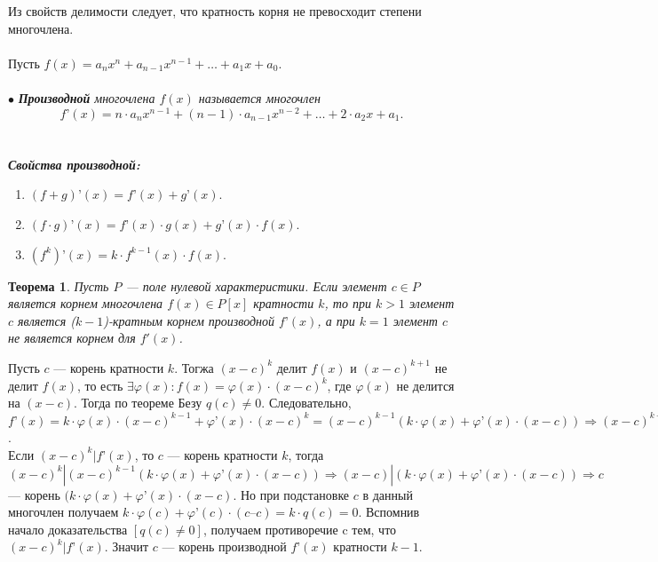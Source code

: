 Из свойств делимости следует, что кратность корня не превосходит степени многочлена.\\\\
Пусть $f(x) = a_nx^n + a_{n-1}x^{n-1} + \ldots + a_1x + a_0$.\\\\
$\bullet$ \textit{\textbf{Производной} многочлена $f(x)$ называется многочлен $$f’(x) = n \cdot a_nx^{n-1} + (n - 1) \cdot a_{n-1}x^{n-2} + \ldots + 2 \cdot a_2x+ a_1.$$}\\\\
\textit{\textbf{Свойства производной:}}
\begin{enumerate}
	\item $(f + g)’(x) = f ’(x) + g’(x).$
	\item $(f \cdot g)’(x) = f’(x) \cdot g(x) + g’(x) \cdot f(x).$
	\item $(f^k)’(x) = k \cdot f^{k-1}(x) \cdot f(x).
	$
\end{enumerate}
\newtheorem*{863}{Теорема}\begin{863}
	Пусть $P$ --- поле нулевой характеристики. Если элемент $c \in P$ является корнем многочлена $f(x) \in P[x]$ кратности $k$, то 
	при $k > 1$ элемент $c$ является ($k-1$)-кратным корнем производной $f’(x)$, а при $k = 1$ элемент $c$ не является корнем для $f'(x)$.
\end{863}
\begin{Proof}
	Пусть $c$ --- корень кратности $k$. Тогжа $(x - c)^k$ делит $f(x)$ и $(x - c)^{k+1}$ не делит $f(x)$, то есть $\exists \varphi(x) : f(x) = \varphi(x)\cdot (x - c)^k$, где $\varphi(x)$ не 
	делится на $(x - c)$. Тогда по теореме Безу $q(c) \not= 0$. Следовательно, $f’(x) = k\cdot \varphi(x)\cdot (x - c)^{k-1} + \varphi’(x)\cdot (x - c)^k = (x - c)^{k-1}(k\cdot \varphi(x) + 
	\varphi’(x)\cdot (x - c)) \Rightarrow (x - c)^{k-1}|f’(x)$. \\
	Если $(x - c)^k
	|f’(x)$, то $c$ --- корень кратности $k$, тогда $(x - c)^k|(x - c)^{k-1}(k\cdot \varphi(x) + \varphi’(x)\cdot (x - c)) \Rightarrow (x - c)|(k\cdot \varphi(x) + \varphi’(x)\cdot (x - c))\Rightarrow c$ --- корень $(k\cdot \varphi(x) + \varphi’(x)\cdot (x - c)$. Но при подстановке $c$ в данный 
	многочлен получаем $k\cdot\varphi(c) + \varphi’(c)\cdot(c – c) = k\cdot q(c) = 0$. Вспомнив начало доказательства $[q(c) \not= 0]$, получаем противоречие c тем, что $(x - c)^k|f’(x)$. Значит $c$ --- корень производной $f’(x)$ кратности $k-1$. 
\end{Proof}


